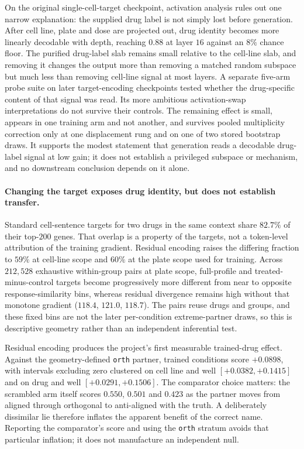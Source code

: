 On the original single-cell-target checkpoint, activation analysis rules out one narrow explanation:
the supplied drug label is not simply lost
before generation. After cell line, plate and dose are projected out, drug identity becomes more
linearly decodable with depth, reaching $0.88$ at layer $16$ against an $8\%$ chance floor. The
purified drug-label slab remains small relative to the cell-line slab, and removing it changes the
output more than removing a matched random subspace but much less than removing cell-line signal at
most layers. A separate five-arm probe suite on later target-encoding checkpoints tested whether the
drug-specific content of that signal was read. Its more ambitious activation-swap interpretations
do not survive their controls. The
remaining effect is small, appears in one training arm and not another, and survives pooled
multiplicity correction only at one displacement rung and on one of two stored bootstrap draws.
It supports the modest statement that generation reads a decodable drug-label signal at low gain;
it does not establish a privileged subspace or mechanism, and no downstream conclusion depends on
it alone.

\paragraph{Changing the target exposes drug identity, but does not establish transfer.} Standard
cell-sentence targets for two drugs in the same context share $82.7\%$ of their top-$200$ genes.
That overlap is a property of the targets, not a token-level attribution of the training gradient.
Residual encoding raises the differing fraction to $59\%$ at cell-line scope and $60\%$ at the
plate scope used for training. Across $212{,}528$ exhaustive within-group pairs at plate scope,
full-profile and treated-minus-control targets become progressively more different from near to
opposite response-similarity bins, whereas residual divergence remains high without that monotone
gradient ($118.4$, $121.0$, $118.7$). The pairs reuse drugs and groups, and these fixed bins are not
the later per-condition extreme-partner draws, so this is descriptive geometry rather than an
independent inferential test.

Residual encoding produces the project's first measurable trained-drug effect. Against the
geometry-defined \texttt{orth} partner, trained conditions score $+0.0898$, with intervals
excluding zero clustered on cell line and well \nolinebreak[3]$[+0.0382,+0.1415]$ and on drug and
well \nolinebreak[3]$[+0.0291,+0.1506]$. The comparator choice matters: the scrambled arm itself
scores $0.550$, $0.501$ and $0.423$ as the partner moves from aligned through orthogonal to
anti-aligned with the truth. A deliberately dissimilar lie therefore inflates the apparent benefit
of the correct name. Reporting the comparator's score and using the \texttt{orth} stratum avoids
that particular inflation; it does not manufacture an independent null.

